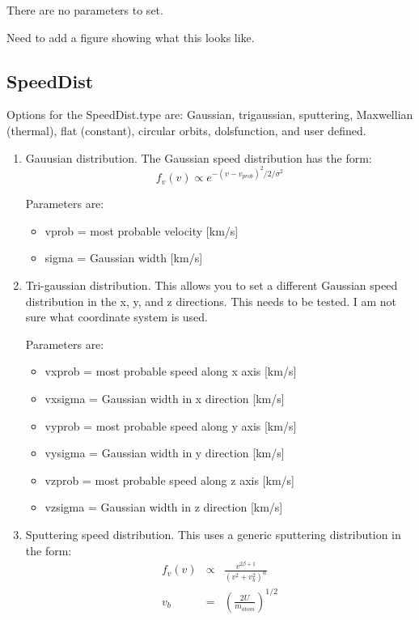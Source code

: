 \documentclass[11pt]{article}
\begin{document}
\begin{enumerate}
There are no parameters to set. 

Need to add a figure showing what this looks like.

\end{enumerate}

\subsection{SpeedDist}

Options for the SpeedDist.type are: Gaussian, trigaussian, sputtering,
Maxwellian (thermal), flat (constant), circular orbits, dolsfunction, and
user defined.

\begin{enumerate}
\item Gauusian distribution. The Gaussian speed distribution has the form:
\begin{equation}
f_v(v) \propto e^{-(v-v_{prob})^2/2/\sigma^2}
\end{equation}

Parameters are:
  \begin{itemize}
  \item vprob = most probable velocity [km/s]
  \item sigma = Gaussian width [km/s]
  \end{itemize}

\item Tri-gaussian distribution. This allows you to set a different Gaussian
speed distribution in the x, y, and z directions. This needs to be tested. I am
not sure what coordinate system is used.

Parameters are:
  \begin{itemize}
  \item vxprob = most probable speed along x axis [km/s]
  \item vxsigma = Gaussian width in x direction [km/s]
  \item vyprob = most probable speed along y axis [km/s]
  \item vysigma = Gaussian width in y direction [km/s]
  \item vzprob = most probable speed along z axis [km/s]
  \item vzsigma = Gaussian width in z direction [km/s]
  \end{itemize}

\item Sputtering speed distribution. This uses a generic sputtering
distribution in the form:
\begin{eqnarray}
f_v(v) & \propto & \frac{v^{2\beta+1}}{(v^2 + v_b^2)^\alpha} \\
v_b & = & \left(\frac{2U}{m_{atom}}\right)^{1/2}
\end{eqnarray}


\end{enumerate}
\end{document}
